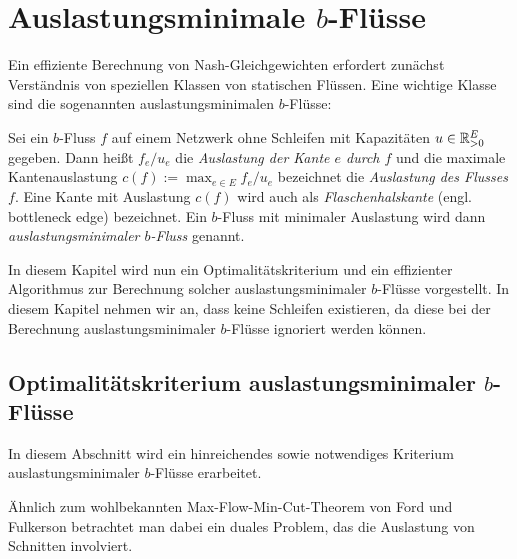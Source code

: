 \chapter{Auslastungsminimale $b$-Flüsse}

Ein effiziente Berechnung von Nash-Gleichgewichten erfordert zunächst Verständnis von speziellen Klassen von statischen Flüssen.
Eine wichtige Klasse sind die sogenannten auslastungsminimalen $b$-Flüsse:

\begin{definition}
	Sei ein $b$-Fluss $f$ auf einem Netzwerk ohne Schleifen mit Kapazitäten $u\in\mathbb{R}_{>0}^E$ gegeben.
	Dann heißt $f_e/u_e$ die \emph{Auslastung der Kante $e$ durch $f$} und die maximale Kantenauslastung $c(f):=\max_{e\in E} f_e/u_e$ bezeichnet die \emph{Auslastung des Flusses $f$}.
	Eine Kante mit Auslastung $c(f)$ wird auch als \emph{Flaschenhalskante} (engl. bottleneck edge) bezeichnet.
	Ein $b$-Fluss mit minimaler Auslastung wird dann \emph{auslastungsminimaler $b$-Fluss} genannt.
\end{definition}

In diesem Kapitel wird nun ein Optimalitätskriterium und ein effizienter Algorithmus zur Berechnung solcher auslastungsminimaler $b$-Flüsse vorgestellt.
In diesem Kapitel nehmen wir an, dass keine Schleifen existieren, da diese bei der Berechnung auslastungsminimaler $b$-Flüsse ignoriert werden können.

\section{Optimalitätskriterium auslastungsminimaler $b$-Flüsse}

In diesem Abschnitt wird ein hinreichendes sowie notwendiges Kriterium auslastungsminimaler $b$-Flüsse erarbeitet.

Ähnlich zum wohlbekannten Max-Flow-Min-Cut-Theorem von Ford und Fulkerson betrachtet man dabei ein duales Problem, das die Auslastung von Schnitten involviert.

